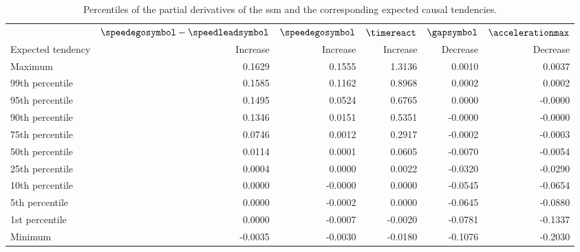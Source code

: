 \begin{table}
	\centering
	\caption{Percentiles of the partial derivatives of the \ac{ssm} and the corresponding expected causal tendencies.}
	\label{tab:tendencies}
	\begin{tabular}{lrrrrr}
		\toprule
		& $\speedegosymbol-\speedleadsymbol$ & $\speedegosymbol$ & $\timereact$ & $\gapsymbol$ & $\accelerationmax$ \\
		\otoprule
		Expected tendency & Increase & Increase & Increase & Decrease & Decrease \\
		Maximum         &  0.1629 &  0.1555 &  1.3136 &  0.0010 &  0.0037 \\
		99th percentile &  0.1585 &  0.1162 &  0.8968 &  0.0002 &  0.0002 \\
		95th percentile &  0.1495 &  0.0524 &  0.6765 &  0.0000 & -0.0000 \\
		90th percentile &  0.1346 &  0.0151 &  0.5351 & -0.0000 & -0.0000 \\
		75th percentile &  0.0746 &  0.0012 &  0.2917 & -0.0002 & -0.0003 \\
		50th percentile &  0.0114 &  0.0001 &  0.0605 & -0.0070 & -0.0054 \\
		25th percentile &  0.0004 &  0.0000 &  0.0022 & -0.0320 & -0.0290 \\
		10th percentile &  0.0000 & -0.0000 &  0.0000 & -0.0545 & -0.0654 \\
		 5th percentile &  0.0000 & -0.0002 &  0.0000 & -0.0645 & -0.0880 \\
		 1st percentile &  0.0000 & -0.0007 & -0.0020 & -0.0781 & -0.1337 \\
		Minimum         & -0.0035 & -0.0030 & -0.0180 & -0.1076 & -0.2030 \\
		\bottomrule
	\end{tabular}
\end{table}

